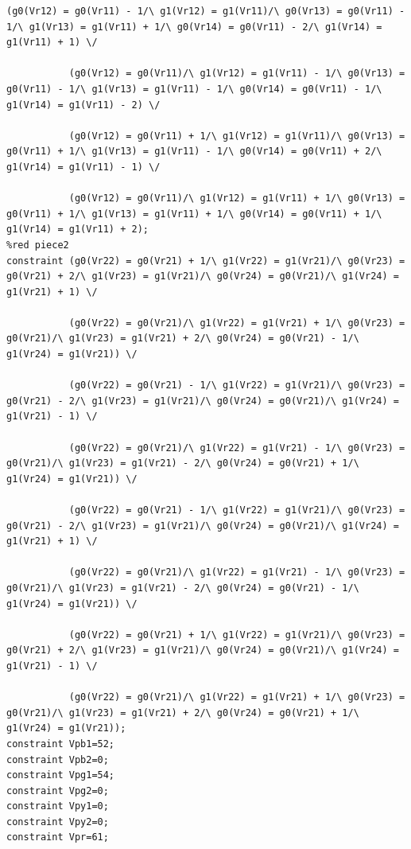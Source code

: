 \begin{appendices}
\begin{lstlisting}[language=minizinc]
           (g0(Vr12) = g0(Vr11) - 1/\ g1(Vr12) = g1(Vr11)/\ g0(Vr13) = g0(Vr11) - 1/\ g1(Vr13) = g1(Vr11) + 1/\ g0(Vr14) = g0(Vr11) - 2/\ g1(Vr14) = g1(Vr11) + 1) \/
           
           (g0(Vr12) = g0(Vr11)/\ g1(Vr12) = g1(Vr11) - 1/\ g0(Vr13) = g0(Vr11) - 1/\ g1(Vr13) = g1(Vr11) - 1/\ g0(Vr14) = g0(Vr11) - 1/\ g1(Vr14) = g1(Vr11) - 2) \/
           
           (g0(Vr12) = g0(Vr11) + 1/\ g1(Vr12) = g1(Vr11)/\ g0(Vr13) = g0(Vr11) + 1/\ g1(Vr13) = g1(Vr11) - 1/\ g0(Vr14) = g0(Vr11) + 2/\ g1(Vr14) = g1(Vr11) - 1) \/
           
           (g0(Vr12) = g0(Vr11)/\ g1(Vr12) = g1(Vr11) + 1/\ g0(Vr13) = g0(Vr11) + 1/\ g1(Vr13) = g1(Vr11) + 1/\ g0(Vr14) = g0(Vr11) + 1/\ g1(Vr14) = g1(Vr11) + 2);
%red piece2           
constraint (g0(Vr22) = g0(Vr21) + 1/\ g1(Vr22) = g1(Vr21)/\ g0(Vr23) = g0(Vr21) + 2/\ g1(Vr23) = g1(Vr21)/\ g0(Vr24) = g0(Vr21)/\ g1(Vr24) = g1(Vr21) + 1) \/

           (g0(Vr22) = g0(Vr21)/\ g1(Vr22) = g1(Vr21) + 1/\ g0(Vr23) = g0(Vr21)/\ g1(Vr23) = g1(Vr21) + 2/\ g0(Vr24) = g0(Vr21) - 1/\ g1(Vr24) = g1(Vr21)) \/
           
           (g0(Vr22) = g0(Vr21) - 1/\ g1(Vr22) = g1(Vr21)/\ g0(Vr23) = g0(Vr21) - 2/\ g1(Vr23) = g1(Vr21)/\ g0(Vr24) = g0(Vr21)/\ g1(Vr24) = g1(Vr21) - 1) \/
           
           (g0(Vr22) = g0(Vr21)/\ g1(Vr22) = g1(Vr21) - 1/\ g0(Vr23) = g0(Vr21)/\ g1(Vr23) = g1(Vr21) - 2/\ g0(Vr24) = g0(Vr21) + 1/\ g1(Vr24) = g1(Vr21)) \/
           
           (g0(Vr22) = g0(Vr21) - 1/\ g1(Vr22) = g1(Vr21)/\ g0(Vr23) = g0(Vr21) - 2/\ g1(Vr23) = g1(Vr21)/\ g0(Vr24) = g0(Vr21)/\ g1(Vr24) = g1(Vr21) + 1) \/
           
           (g0(Vr22) = g0(Vr21)/\ g1(Vr22) = g1(Vr21) - 1/\ g0(Vr23) = g0(Vr21)/\ g1(Vr23) = g1(Vr21) - 2/\ g0(Vr24) = g0(Vr21) - 1/\ g1(Vr24) = g1(Vr21)) \/
           
           (g0(Vr22) = g0(Vr21) + 1/\ g1(Vr22) = g1(Vr21)/\ g0(Vr23) = g0(Vr21) + 2/\ g1(Vr23) = g1(Vr21)/\ g0(Vr24) = g0(Vr21)/\ g1(Vr24) = g1(Vr21) - 1) \/
           
           (g0(Vr22) = g0(Vr21)/\ g1(Vr22) = g1(Vr21) + 1/\ g0(Vr23) = g0(Vr21)/\ g1(Vr23) = g1(Vr21) + 2/\ g0(Vr24) = g0(Vr21) + 1/\ g1(Vr24) = g1(Vr21));    
constraint Vpb1=52;
constraint Vpb2=0;
constraint Vpg1=54;
constraint Vpg2=0;
constraint Vpy1=0;
constraint Vpy2=0;
constraint Vpr=61;
\end{lstlisting}

\end{appendices}
